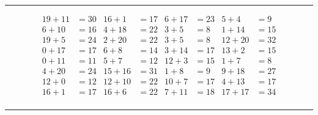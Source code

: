 \documentclass{article}
\begin{document}
\begin{sloppy}
\hrule
\begin{align*}
    {19} + {11} &= {30} & {16} + {1} &= {17} & {6} + {17} &= {23} & {5} + {4} &= {9} \\
    {6} + {10} &= {16} & {4} + {18} &= {22} & {3} + {5} &= {8} & {1} + {14} &= {15} \\
    {19} + {5} &= {24} & {2} + {20} &= {22} & {3} + {5} &= {8} & {12} + {20} &= {32} \\
    {0} + {17} &= {17} & {6} + {8} &= {14} & {3} + {14} &= {17} & {13} + {2} &= {15} \\
    {0} + {11} &= {11} & {5} + {7} &= {12} & {12} + {3} &= {15} & {1} + {7} &= {8} \\
    {4} + {20} &= {24} & {15} + {16} &= {31} & {1} + {8} &= {9} & {9} + {18} &= {27} \\
    {12} + {0} &= {12} & {12} + {10} &= {22} & {10} + {7} &= {17} & {4} + {13} &= {17} \\
    {16} + {1} &= {17} & {16} + {6} &= {22} & {7} + {11} &= {18} & {17} + {17} &= {34} \\
\end{align*}
\hrule
\end{sloppy}
\end{document}
